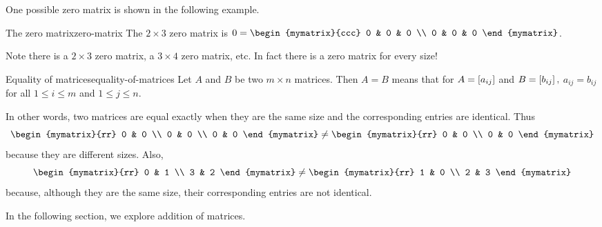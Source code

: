 One possible zero matrix is shown in the following example.

\begin{example}{The zero matrix}{zero-matrix}
The $2\times 3$ zero matrix is $0= \begin{mymatrix}{ccc}
0 & 0 & 0 \\
0 & 0 & 0
\end{mymatrix} $.
\end{example}

Note there is a $2\times 3$ zero matrix, a $3\times 4$ zero matrix, etc. In
fact there is a zero matrix for every size!

\begin{definition}{Equality of matrices}{equality-of-matrices}
 Let $A$ and $B$ be two $m \times n$ matrices. Then $A=B$ means
that for $A=\left[a_{ij}\right] $
and $B=\left[b_{ij}\right] ,$ $a_{ij}=b_{ij}$ for all $1\leq i\leq m$ and
$1\leq j\leq n.$
\end{definition}

In other words, two matrices are equal exactly when they are the same size and the
corresponding entries are identical. Thus
\begin{equation*}
\begin{mymatrix}{rr}
0 & 0 \\
0 & 0 \\
0 & 0
\end{mymatrix} \neq \begin{mymatrix}{rr}
0 & 0 \\
0 & 0
\end{mymatrix}
\end{equation*}
because they are different sizes.
Also,
\begin{equation*}
\begin{mymatrix}{rr}
0 & 1 \\
3 & 2
\end{mymatrix} \neq \begin{mymatrix}{rr}
1 & 0 \\
2 & 3
\end{mymatrix}
\end{equation*}
because, although they are the same size, their corresponding entries are not identical.

In the following section, we explore addition of matrices.
